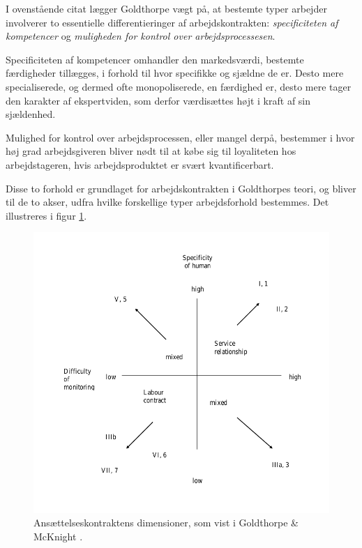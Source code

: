 I ovenstående citat lægger Goldthorpe vægt på, at bestemte typer arbejder involverer to essentielle differentieringer af arbejdskontrakten:  \emph{specificiteten af kompetencer} og \emph{muligheden for kontrol over arbejdsprocessesen}. 

Specificiteten af kompetencer omhandler den markedsværdi, bestemte færdigheder tillægges, i forhold til hvor specifikke og sjældne de er. Desto mere specialiserede, og dermed ofte monopoliserede, en færdighed er, desto mere tager den karakter af ekspertviden, som derfor værdisættes højt i kraft af sin sjældenhed. 

Mulighed for kontrol over arbejdsprocessen, eller mangel derpå, bestemmer i hvor høj grad arbejdsgiveren bliver nødt til at købe sig til loyaliteten hos arbejdstageren, hvis arbejdsproduktet er svært kvantificerbart.

Disse to forhold er grundlaget for arbejdskontrakten i Goldthorpes teori, og bliver til de to akser, udfra hvilke forskellige typer arbejdsforhold bestemmes. Det illustreres i figur \ref{fig_teori_klasse_Goldthorpe_arbejdskontraktdimensioner}. 

\begin{figure}[H]
\begin{centering}
	\includegraphics[width=\textwidth]{fig/Goldthorpe_ansaettelseskontrakt.png}
	\caption{Ansættelseskontraktens dimensioner, som vist i Goldthorpe \& McKnight  \citeyear[4]{GoldthorpeMcKnight2004}.}
	\label{fig_teori_klasse_Goldthorpe_arbejdskontraktdimensioner}
\end{centering}
\end{figure}

